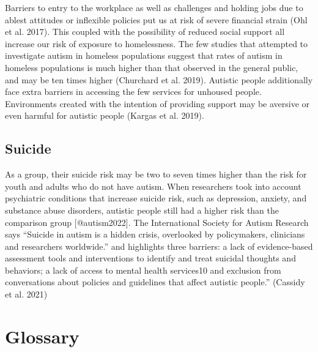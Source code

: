 \documentclass[
  letterpaper,
  DIV=11,
  numbers=noendperiod]{scrreprt}
\begin{document}
Barriers to entry to the workplace as well as challenges and holding
jobs due to ablest attitudes or inflexible policies put us at risk of
severe financial strain (Ohl et al. 2017). This coupled with the
possibility of reduced social support all increase our risk of exposure
to homelessness. The few studies that attempted to investigate autism in
homeless populations suggest that rates of autism in homeless
populations is much higher than that observed in the general public, and
may be ten times higher (Churchard et al. 2019). Autistic people
additionally face extra barriers in accessing the few services for
unhoused people. Environments created with the intention of providing
support may be aversive or even harmful for autistic people (Kargas et
al. 2019).

\hypertarget{sec-suicide}{%
\section{Suicide}\label{sec-suicide}}

As a group, their suicide risk may be two to seven times higher than the
risk for youth and adults who do not have autism. When researchers took
into account psychiatric conditions that increase suicide risk, such as
depression, anxiety, and substance abuse disorders, autistic people
still had a higher risk than the comparison group
{[}@\textbar autism2022{]}. The International Society for Autism
Research says ``Suicide in autism is a hidden crisis, overlooked by
policymakers, clinicians and researchers worldwide.'' and highlights
three barriers: a lack of evidence-based assessment tools and
interventions to identify and treat suicidal thoughts and behaviors; a
lack of access to mental health services10 and exclusion from
conversations about policies and guidelines that affect autistic
people.'' (Cassidy et al. 2021)

\hypertarget{appendix-glossary}{%
\chapter{Glossary}\label{appendix-glossary}}
\end{document}
